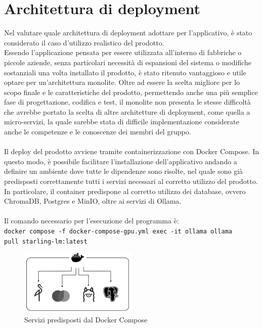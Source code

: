 \section{Architettura di deployment} \label{sec:archdeplo}
Nel valutare quale architettura di deployment adottare per l'applicativo, è stato considerato il caso d'utilizzo realistico del prodotto.\\
Essendo l'applicazione pensata per essere utilizzata all'interno di fabbriche o piccole aziende, senza particolari necessità di espansioni del sistema o modifiche sostanziali una volta installato il prodotto, è stato ritenuto vantaggioso e utile optare per un'architettura monolite. Oltre ad essere la scelta migliore per lo scopo finale e le caratteristiche del prodotto, permettendo anche una più semplice fase di progettazione, codifica e test, il  monolite non presenta le stesse difficoltà che avrebbe portato la scelta di altre architetture di deployment, come quella a micro-servizi, la quale sarebbe stata di difficile implementazione considerate anche le competenze e le conoscenze dei membri del gruppo.\\ \\
Il deploy del prodotto avviene tramite containerizzazione con Docker Compose. In questo modo, è possibile facilitare l'installazione dell'applicativo andando a definire un ambiente dove tutte le dipendenze sono risolte, nel quale sono già predisposti correttamente tutti i servizi necessari al corretto utilizzo del prodotto. In particolare, il container predispone al corretto utilizzo dei database, ovvero ChromaDB, Postgres e MinIO, oltre ai servizi di Ollama.
\\ \\ 
Il comando necessario per l'esecuzione del programma è: \\
\texttt{docker compose -f docker-compose-gpu.yml exec -it ollama ollama \\ pull starling-lm:latest}
\vspace{2cm}

\begin{figure}[h!]
    \centering  
    \includegraphics[width=0.5\textwidth]{docker.png}
    \caption{Servizi predisposti dal Docker Compose}
\end{figure}

\newpage